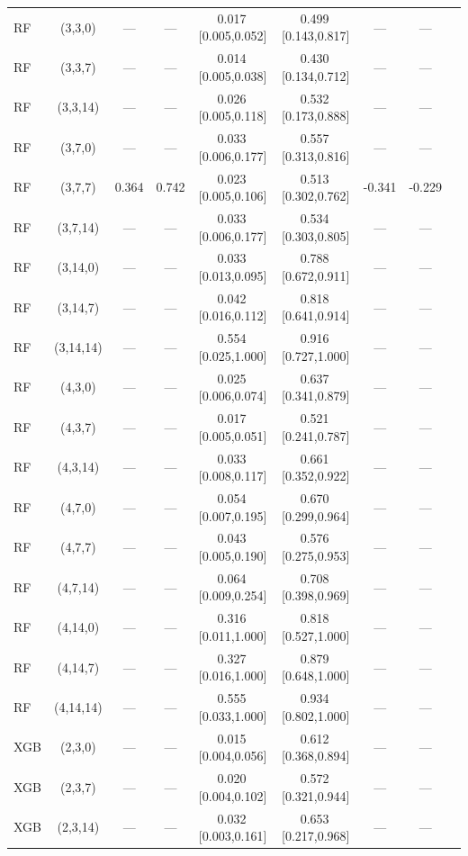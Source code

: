 \begin{longtable}{lcccccccc}
RF & (3,3,0) & --- & --- & 0.017\,[0.005,0.052] & 0.499\,[0.143,0.817] & --- & --- \\
RF & (3,3,7) & --- & --- & 0.014\,[0.005,0.038] & 0.430\,[0.134,0.712] & --- & --- \\
RF & (3,3,14) & --- & --- & 0.026\,[0.005,0.118] & 0.532\,[0.173,0.888] & --- & --- \\
RF & (3,7,0) & --- & --- & 0.033\,[0.006,0.177] & 0.557\,[0.313,0.816] & --- & --- \\
RF & (3,7,7) & 0.364 & 0.742 & 0.023\,[0.005,0.106] & 0.513\,[0.302,0.762] & -0.341 & -0.229 \\
RF & (3,7,14) & --- & --- & 0.033\,[0.006,0.177] & 0.534\,[0.303,0.805] & --- & --- \\
RF & (3,14,0) & --- & --- & 0.033\,[0.013,0.095] & 0.788\,[0.672,0.911] & --- & --- \\
RF & (3,14,7) & --- & --- & 0.042\,[0.016,0.112] & 0.818\,[0.641,0.914] & --- & --- \\
RF & (3,14,14) & --- & --- & 0.554\,[0.025,1.000] & 0.916\,[0.727,1.000] & --- & --- \\
RF & (4,3,0) & --- & --- & 0.025\,[0.006,0.074] & 0.637\,[0.341,0.879] & --- & --- \\
RF & (4,3,7) & --- & --- & 0.017\,[0.005,0.051] & 0.521\,[0.241,0.787] & --- & --- \\
RF & (4,3,14) & --- & --- & 0.033\,[0.008,0.117] & 0.661\,[0.352,0.922] & --- & --- \\
RF & (4,7,0) & --- & --- & 0.054\,[0.007,0.195] & 0.670\,[0.299,0.964] & --- & --- \\
RF & (4,7,7) & --- & --- & 0.043\,[0.005,0.190] & 0.576\,[0.275,0.953] & --- & --- \\
RF & (4,7,14) & --- & --- & 0.064\,[0.009,0.254] & 0.708\,[0.398,0.969] & --- & --- \\
RF & (4,14,0) & --- & --- & 0.316\,[0.011,1.000] & 0.818\,[0.527,1.000] & --- & --- \\
RF & (4,14,7) & --- & --- & 0.327\,[0.016,1.000] & 0.879\,[0.648,1.000] & --- & --- \\
RF & (4,14,14) & --- & --- & 0.555\,[0.033,1.000] & 0.934\,[0.802,1.000] & --- & --- \\
XGB & (2,3,0) & --- & --- & 0.015\,[0.004,0.056] & 0.612\,[0.368,0.894] & --- & --- \\
XGB & (2,3,7) & --- & --- & 0.020\,[0.004,0.102] & 0.572\,[0.321,0.944] & --- & --- \\
XGB & (2,3,14) & --- & --- & 0.032\,[0.003,0.161] & 0.653\,[0.217,0.968] & --- & --- \\

\end{longtable}

